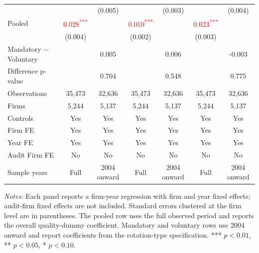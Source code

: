 \documentclass[10pt]{article}
\newcommand{\sym}[1]{\textsuperscript{#1}}
\begin{document}
\begin{minipage}{19cm}
\begin{threeparttable}
\begin{tabular}{l cc cc cc}
 &  & (0.005) &  & (0.003) &  & (0.004) \\
Pooled & \textcolor{red}{0.028\sym{***}} &  & \textcolor{red}{0.010\sym{***}} &  & \textcolor{red}{0.023\sym{***}} &  \\
 & (0.004) &  & (0.002) &  & (0.003) &  \\
Mandatory $-$ Voluntary &  & 0.005 &  & 0.006 &  & -0.003 \\
Difference p-value &  & 0.704 &  & 0.548 &  & 0.775 \\
Observations & 35,473 & 32,636 & 35,473 & 32,636 & 35,473 & 32,636 \\
Firms & 5,244 & 5,137 & 5,244 & 5,137 & 5,244 & 5,137 \\
\midrule
Controls & Yes & Yes & Yes & Yes & Yes & Yes \\
Firm FE & Yes & Yes & Yes & Yes & Yes & Yes \\
Year FE & Yes & Yes & Yes & Yes & Yes & Yes \\
Audit Firm FE & No & No & No & No & No & No \\
Sample years & Full & 2004 onward & Full & 2004 onward & Full & 2004 onward \\
\bottomrule
\end{tabular}
\begin{tablenotes}\fontsize{9}{11}\selectfont
\item \fontsize{9}{11}\selectfont \textit{Notes:} Each panel reports a firm-year regression with firm and year fixed effects; audit-firm fixed effects are not included. Standard errors clustered at the firm level are in parentheses. The pooled row uses the full observed period and reports the overall quality-dummy coefficient. Mandatory and voluntary rows use 2004 onward and report coefficients from the rotation-type specification. *** \(p<0.01\), ** \(p<0.05\), * \(p<0.10\).
\end{tablenotes}
\end{threeparttable}

\end{minipage}
\end{document}
